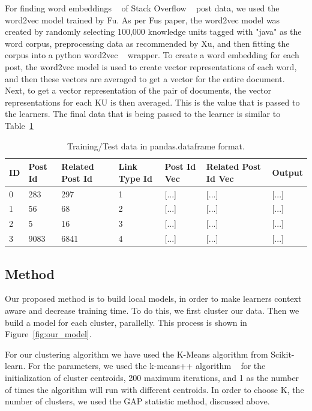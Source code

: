 \documentclass[sigconf]{acmart}
\theoremstyle{break}
\begin{document}
    For finding word embeddings ~\cite{mikolov2013distributed} of Stack Overflow ~\cite{barua2014developers} post data, we used the word2vec model trained by Fu. As per Fu\textquotesingle s paper, the word2vec model was created by randomly selecting 100,000 knowledge units tagged with "java" as the word corpus, preprocessing data as recommended by Xu, and then fitting the corpus into a python word2vec ~\cite{rehurek2010software} wrapper. To create a word embedding for each post, the word2vec model is used to create vector representations of each word, and then these vectors are averaged to get a vector for the entire document. Next, to get a vector representation of the pair of documents, the vector representations for each KU is then averaged. This is the value that is passed to the learners. The final data that is being passed to the learner is similar to Table~\ref{tab:data_format}
    
    \begin{table}[h!]
        \centering
        \begin{tabular}{p{.3cm}|p{1cm}|p{1cm}|p{1cm}|p{1cm}|p{1cm}|p{1cm}}
        \textbf{ID} & \textbf{Post Id} & \textbf{Related Post Id} & \textbf{Link Type Id} & \textbf{Post Id Vec} & \textbf{Related Post Id Vec} & \textbf{Output}  \\
        \hline
        0 & 283 & 297 & 1  & [...] & [...] & [...] \\
        \hline
        1 & 56 & 68 & 2  & [...] & [...] & [...] \\
        \hline
        2 & 5 & 16 & 3  & [...] & [...] & [...] \\
        \hline
        3 & 9083 & 6841 & 4  & [...] & [...] & [...] \\
        \hline
        \end{tabular}
        \caption{Training/Test data in pandas.dataframe format.}
        \label{tab:data_format}
    \end{table}
    
    \subsection{Method}
    \label{sssec:Method}
    Our proposed method is to build local models, in order to make learners context aware and decrease training time. To do this, we first cluster our data. Then we build a model for each cluster, parallelly. This process is shown in Figure~\ref{fig:our_model}.
    
    For our clustering algorithm we have used the K-Means algorithm from Scikit-learn. For the parameters, we used the k-means++ algorithm ~\cite{arthur2007k} for the initialization of cluster centroids, 200 maximum iterations, and 1 as the number of times the algorithm will run with different centroids. In order to choose K, the number of clusters, we used the GAP statistic method, discussed above.
    
\end{document}
